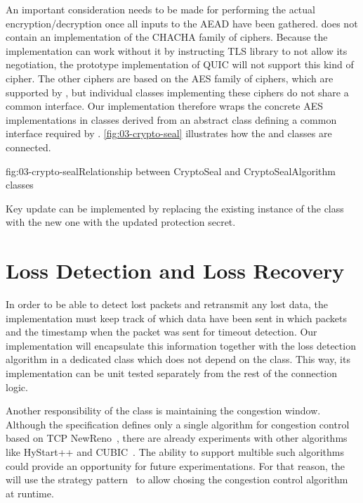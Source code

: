 An important consideration needs to be made for performing the actual encryption/decryption once all
inputs to the AEAD have been gathered. \dotnet{} does not contain an implementation of the CHACHA
family of ciphers. Because the implementation can work without it by instructing TLS library to not
allow its negotiation, the prototype implementation of QUIC will not support this kind of cipher.
The other ciphers are based on the AES family of ciphers, which are supported by \dotnet{}, but
individual classes implementing these ciphers do not share a common interface. Our implementation
therefore wraps the concrete AES implementations in classes derived from an abstract
 class defining a common interface required by \CryptoSeal{}.
\autoref{fig:03-crypto-seal} illustrates how the \CryptoSeal{} and 
classes are connected.

\begin{myFigure}{fig:03-crypto-seal}{Relationship between CryptoSeal and CryptoSealAlgorithm classes}

  \resizebox{\linewidth}{!}{}

\end{myFigure}

Key update can be implemented by replacing the existing instance of the
\CryptoSeal{} class with the new one with the updated protection secret.

\section{Loss Detection and Loss Recovery}

In order to be able to detect lost packets and retransmit any lost data, the \QuicConnection{}
implementation must keep track of which data have been sent in which packets and the timestamp when
the packet was sent for timeout detection. Our implementation will encapsulate this information
together with the loss detection algorithm in a dedicated \RecoveryController{} class which does not
depend on the \QuicConnection{} class. This way, its implementation can be unit tested separately
from the rest of the connection logic.

Another responsibility of the \RecoveryController{} class is maintaining the congestion window.
Although the specification defines only a single algorithm for congestion control based on TCP
NewReno~\cite[Section~7]{draft-ietf-quic-recovery}, there are already experiments with other
algorithms like HyStart++ and CUBIC~\cite{cloudflareCubic}. The ability to support multible such
algorithms could provide an opportunity for future experimentations. For that reason, the
\RecoveryController{} will use the strategy pattern~\cite{wiki:strategy-pattern} to allow chosing
the congestion control algorithm at runtime.

